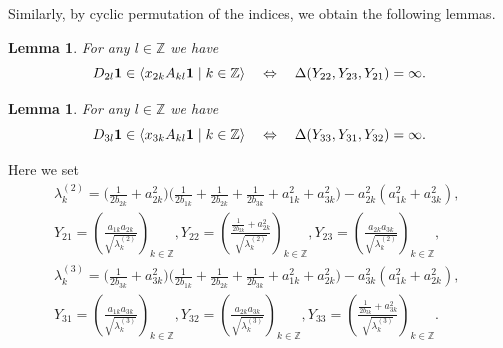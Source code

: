 \documentclass[preprint,12pt]{elsarticle}
\newtheorem{lem}[thm]{Lemma}
\numberwithin{equation}{section}
\begin{document}
% 
Similarly, by cyclic permutation of the indices, we obtain the following lemmas.
\begin{lem}
\label{dx2.3}
 For any  $l\in {\mathbb Z}$ we have
$$
D_{2l}{\bf 1}\in\langle x_{2k}A_{kl}{\bf 1}\mid k\in {\mathbb Z}\rangle
\quad\Leftrightarrow\quad 
\Delta(Y_{22},Y_{23},Y_{21})=\infty.
$$
\end{lem}
%
\begin{lem}
\label{dx3.3}
 For any  $l\in {\mathbb Z}$ we have
$$
D_{3l}{\bf 1}\in\langle x_{3k}A_{kl}{\bf 1}\mid k\in {\mathbb Z}\rangle
\quad\Leftrightarrow\quad 
\Delta(Y_{33},Y_{31},Y_{32})=\infty.
$$
\end{lem}
Here we set
\begin{eqnarray}
\label{lambda(2)}
&&\!\!\lambda_k^{(2)}\!=\!\Big(\frac{1}{2b_{2k}}\!+\!a_{2k}^2\Big)\Big(\frac{1}{2b_{1k}}\!+\!\frac{1}{2b_{2k}}\!+\!\frac{1}{2b_{3k}}+a_{1k}^2\!+\!
a_{3k}^2\Big)\!-\!a_{2k}^2(a_{1k}^2\!+\!a_{3k}^2),\,\,\\
\label{y_2(123)}
&&Y_{21}\!=\!\left(\frac{a_{1k}a_{2k}}{\sqrt{\lambda_k^{(2)}}}\right)_{k\in \mathbb Z}\!\!\!\!,
Y_{22}\!=\!\left(\frac{\frac{1}{2b_{2k}}+a_{2k}^2}{\sqrt{\lambda_k^{(2)}}}\right)_{k\in \mathbb Z}\!\!\!,
Y_{23}\!=\!\left(\frac{a_{2k}a_{3k}}{\sqrt{\lambda_k^{(2)}}}\right)_{k\in \mathbb Z}\!\!\!, \\
\label{lambda(3)}
&&\lambda_k^{(3)}\!=\!\Big(\frac{1}{2b_{3k}}\!+\!a_{3k}^2\Big)\Big(\frac{1}{2b_{1k}}\!+\!\frac{1}{2b_{2k}}\!+\!\frac{1}{2b_{3k}}\!+\!a_{1k}^2
\!+\!a_{2k}^2\Big)\!-\!
a_{3k}^2(a_{1k}^2\!+\!a_{2k}^2),\qquad\\
\label{y_3(123)}
&&Y_{31}=\left(\frac{a_{1k}a_{3k}}{\sqrt{\lambda_k^{(3)}}}\right)_{k\in \mathbb Z}, 
Y_{32}=\left(\frac{a_{2k}a_{3k}}{\sqrt{\lambda_k^{(3)}}}\right)_{k\in \mathbb Z},
Y_{33}=\left(\frac{\frac{1}{2b_{3k}}+a_{3k}^2}{\sqrt{\lambda_k^{(3)}}}\right)_{k\in \mathbb Z}.
\end{eqnarray}
\end{document}
